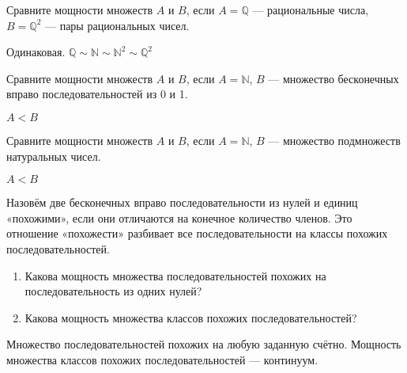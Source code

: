 \begin{problem}
Сравните мощности множеств $ A $ и $ B $, если $ A=\mathbb{Q} $ — рациональные числа, $ B=\mathbb{Q}^{2} $ — пары рациональных чисел.

\begin{sol}
Одинаковая. $ \mathbb{Q}\sim \mathbb{N}\sim \mathbb{N}^{2}\sim \mathbb{Q}^{2} $
\end{sol}
\end{problem}

\begin{problem}
Сравните мощности множеств $A$ и $B$, если $A=\mathbb{N}$, $B$ — множество бесконечных вправо последовательностей из 0 и 1.

\begin{sol}
$A<B$
\end{sol}
\end{problem}

\begin{problem}
Сравните мощности множеств $A$ и $B$, если $A=\mathbb{N}$, $B$ — множество подмножеств натуральных чисел.

\begin{sol}
$A<B$
\end{sol}
\end{problem}

\begin{problem}
Назовём две бесконечных вправо последовательности из нулей и единиц «похожими», если они отличаются на конечное количество членов. Это отношение «похожести» разбивает все последовательности на классы похожих последовательностей.

\begin{enumerate}
\item Какова мощность множества последовательностей похожих на последовательность из одних нулей?
\item Какова мощность множества классов похожих последовательностей?
\end{enumerate}

\begin{sol}
Множество последовательностей похожих на любую заданную счётно. Мощность множества классов похожих последовательностей — континуум.
\end{sol}
\end{problem}

